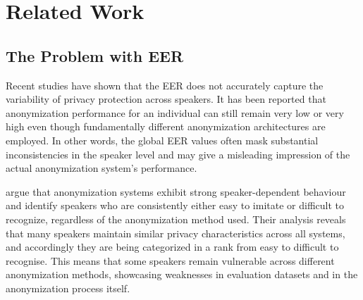 \documentclass[12pt,leqno,a4paper]{article}
\begin{document}
 \section{Related Work}
 \label{sec:related_work}
 
 \subsection{The Problem with EER}
 Recent studies have shown that the EER does not accurately capture the variability of privacy protection across speakers. 
 It has been reported that anonymization performance for an individual can still remain very low or very high even though fundamentally 
 different anonymization architectures are employed. In other words, the global EER values often mask substantial inconsistencies in the speaker 
 level and may give a misleading impression of the actual anonymization system's performance.

\cite{williams_anonymizing_2024} argue that anonymization systems exhibit strong speaker-dependent behaviour and identify speakers who are consistently
either easy to imitate or difficult to recognize, regardless of the anonymization method used. Their analysis reveals that many speakers maintain 
similar privacy characteristics across all systems, and accordingly they are being categorized in a rank from easy to difficult to recognise. 
This means that some speakers remain vulnerable across different anonymization methods, showcasing weaknesses in evaluation datasets and in the 
anonymization process itself.
\end{document}
